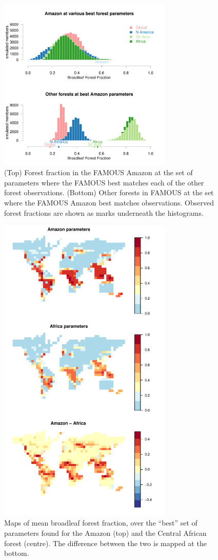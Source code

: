 \documentclass[esd, article]{copernicus} %
\begin{document}
\begin{figure}[t]
\includegraphics[width=8.3cm]{graphics/best_inputs_swaps_hists_Paired.pdf}
\caption{(Top) Forest fraction in the FAMOUS Amazon at the set of parameters where the FAMOUS best matches each of the other forest observations. (Bottom) Other forests in FAMOUS at the set where the FAMOUS Amazon best matches observations. Observed forest fractions are shown as marks underneath the histograms.}
\label{fig:best_inputs_swaps_hists_Paired}
\end{figure}

\begin{figure}[t]
\includegraphics[width=8.3cm]{graphics/best_X_maps.pdf}
\caption{Maps of mean broadleaf forest fraction, over the ``best'' set of parameters found for the Amazon (top) and the Central African forest (centre). The difference between the two is mapped at the bottom.}
\label{fig:best_X_maps}
\end{figure}
\end{document}
